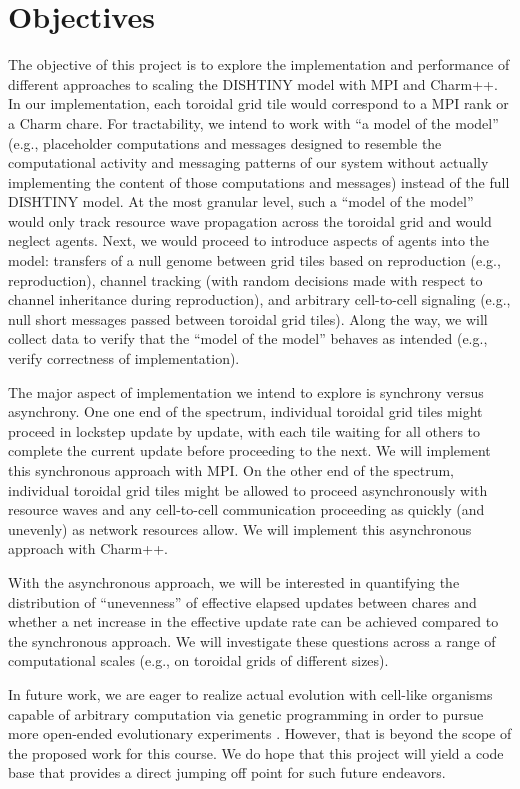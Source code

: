 \section{Objectives}

The objective of this project is to explore the implementation and performance of different approaches to scaling the DISHTINY model with MPI and Charm++.
In our implementation, each toroidal grid tile would correspond to a MPI rank or a Charm chare.
For tractability, we intend to work with ``a model of the model'' (e.g., placeholder computations and messages designed to resemble the computational activity and messaging patterns of our system without actually implementing the content of those computations and messages) instead of the full DISHTINY model.
At the most granular level, such a ``model of the model'' would only track resource wave propagation across the toroidal grid and would neglect agents.
Next, we would proceed to introduce aspects of agents into the model: transfers of a null genome between grid tiles based on reproduction (e.g., reproduction), channel tracking (with random decisions made with respect to channel inheritance during reproduction), and arbitrary cell-to-cell signaling (e.g., null short messages passed between toroidal grid tiles).
Along the way, we will collect data to verify that the ``model of the model'' behaves as intended (e.g., verify correctness of implementation).

The major aspect of implementation we intend to explore is synchrony versus asynchrony.
One one end of the spectrum, individual toroidal grid tiles might proceed in lockstep update by update, with each tile waiting for all others to complete the current update before proceeding to the next.
We will implement this synchronous approach with MPI.
On the other end of the spectrum, individual toroidal grid tiles might be allowed to proceed asynchronously with resource waves and any cell-to-cell communication proceeding as quickly (and unevenly) as network resources allow.
We will implement this asynchronous approach with Charm++.

With the asynchronous approach, we will be interested in quantifying the distribution of ``unevenness'' of effective elapsed updates between chares and whether a net increase in the effective update rate can be achieved compared to the synchronous approach.
We will investigate these questions across a range of computational scales (e.g., on toroidal grids of different sizes).

In future work, we are eager to realize actual evolution with cell-like organisms capable of arbitrary computation via genetic programming in order to pursue more open-ended evolutionary experiments \cite{lalejini2018evolving}.
However, that is beyond the scope of the proposed work for this course.
We do hope that this project will yield a code base that provides a direct jumping off point for such future endeavors.

